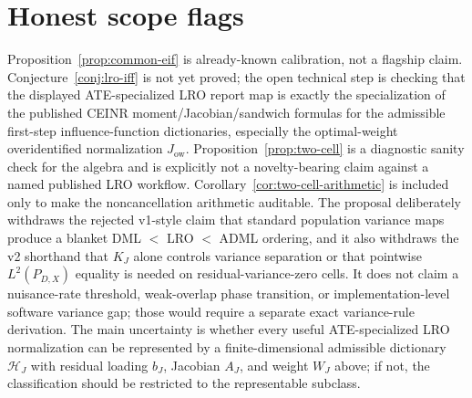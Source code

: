 \documentclass[11pt]{article}
\theoremstyle{definition}
\theoremstyle{plain}
\theoremstyle{remark}
\begin{document}
\section{Honest scope flags}
Proposition~\ref{prop:common-eif} is already-known calibration, not a flagship claim.  Conjecture~\ref{conj:lro-iff} is not yet proved; the open technical step is checking that the displayed ATE-specialized LRO report map is exactly the specialization of the published CEINR moment/Jacobian/sandwich formulas for the admissible first-step influence-function dictionaries, especially the optimal-weight overidentified normalization $J_{\mathrm{ow}}$.  Proposition~\ref{prop:two-cell} is a diagnostic sanity check for the algebra and is explicitly not a novelty-bearing claim against a named published LRO workflow.  Corollary~\ref{cor:two-cell-arithmetic} is included only to make the noncancellation arithmetic auditable.  The proposal deliberately withdraws the rejected v1-style claim that standard population variance maps produce a blanket DML $<$ LRO $<$ ADML ordering, and it also withdraws the v2 shorthand that $K_J$ alone controls variance separation or that pointwise $L^2(P_{D,X})$ equality is needed on residual-variance-zero cells.  It does not claim a nuisance-rate threshold, weak-overlap phase transition, or implementation-level software variance gap; those would require a separate exact variance-rule derivation.  The main uncertainty is whether every useful ATE-specialized LRO normalization can be represented by a finite-dimensional admissible dictionary $\mathcal H_J$ with residual loading $b_J$, Jacobian $A_J$, and weight $W_J$ above; if not, the classification should be restricted to the representable subclass.
\end{document}
